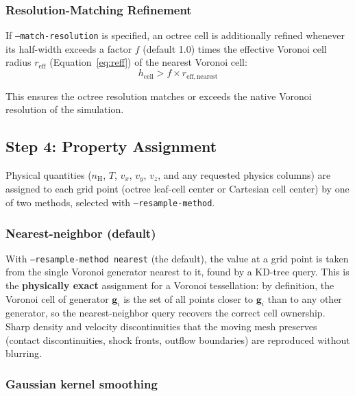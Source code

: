 \documentclass[english,a4paper]{my_memo}
\begin{document}
\subsubsection{Resolution-Matching Refinement}
\label{sec:refine_resolution}

If \texttt{--match-resolution} is specified, an octree cell is
additionally refined whenever its half-width exceeds a factor $f$
(default 1.0) times the effective Voronoi cell radius $r_\mathrm{eff}$
(Equation~\ref{eq:reff}) of the nearest Voronoi cell:
\begin{equation}
h_\mathrm{cell} > f \times r_\mathrm{eff,nearest}
\end{equation}

This ensures the octree resolution matches or exceeds the native
Voronoi resolution of the simulation.

\subsection{Step 4: Property Assignment}
\label{sec:assignment}

Physical quantities ($n_\mathrm{H}$, $T$, $v_x$, $v_y$, $v_z$, and any
requested physics columns) are assigned to each grid point (octree
leaf-cell center or Cartesian cell center) by one of two methods,
selected with \texttt{--resample-method}.

\subsubsection*{Nearest-neighbor (default)}

With \texttt{--resample-method nearest} (the default), the value at a
grid point is taken from the single Voronoi generator nearest to it,
found by a KD-tree query.  This is the \textbf{physically exact}
assignment for a Voronoi tessellation: by definition, the Voronoi cell
of generator $\mathbf{g}_i$ is the set of all points closer to
$\mathbf{g}_i$ than to any other generator, so the nearest-neighbor
query recovers the correct cell ownership.  Sharp density and velocity
discontinuities that the moving mesh preserves (contact
discontinuities, shock fronts, outflow boundaries) are reproduced
without blurring.

\subsubsection*{Gaussian kernel smoothing}
\end{document}
